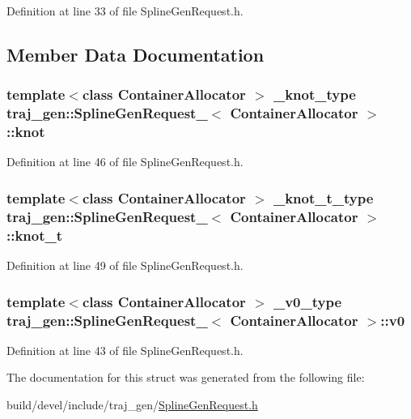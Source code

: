 Definition at line 33 of file Spline\+Gen\+Request.\+h.



\subsection{Member Data Documentation}
\subsubsection[{\texorpdfstring{knot}{knot}}]{\setlength{\rightskip}{0pt plus 5cm}template$<$class Container\+Allocator $>$ {\bf \+\_\+knot\+\_\+type} {\bf traj\+\_\+gen\+::\+Spline\+Gen\+Request\+\_\+}$<$ Container\+Allocator $>$\+::knot}\hypertarget{structtraj__gen_1_1_spline_gen_request___ab6ca79c8e920f25c09dc0b07ceceac4e}{}\label{structtraj__gen_1_1_spline_gen_request___ab6ca79c8e920f25c09dc0b07ceceac4e}


Definition at line 46 of file Spline\+Gen\+Request.\+h.

\subsubsection[{\texorpdfstring{knot\+\_\+t}{knot_t}}]{\setlength{\rightskip}{0pt plus 5cm}template$<$class Container\+Allocator $>$ {\bf \+\_\+knot\+\_\+t\+\_\+type} {\bf traj\+\_\+gen\+::\+Spline\+Gen\+Request\+\_\+}$<$ Container\+Allocator $>$\+::knot\+\_\+t}\hypertarget{structtraj__gen_1_1_spline_gen_request___ae03991c8c3762e1dbd2f53be45f7f026}{}\label{structtraj__gen_1_1_spline_gen_request___ae03991c8c3762e1dbd2f53be45f7f026}


Definition at line 49 of file Spline\+Gen\+Request.\+h.

\subsubsection[{\texorpdfstring{v0}{v0}}]{\setlength{\rightskip}{0pt plus 5cm}template$<$class Container\+Allocator $>$ {\bf \+\_\+v0\+\_\+type} {\bf traj\+\_\+gen\+::\+Spline\+Gen\+Request\+\_\+}$<$ Container\+Allocator $>$\+::v0}\hypertarget{structtraj__gen_1_1_spline_gen_request___a8cf16aad9996e95f2327e72a39d6f07d}{}\label{structtraj__gen_1_1_spline_gen_request___a8cf16aad9996e95f2327e72a39d6f07d}


Definition at line 43 of file Spline\+Gen\+Request.\+h.



The documentation for this struct was generated from the following file\+:\begin{DoxyCompactItemize}
\item 
build/devel/include/traj\+\_\+gen/\hyperlink{_spline_gen_request_8h}{Spline\+Gen\+Request.\+h}\end{DoxyCompactItemize}
